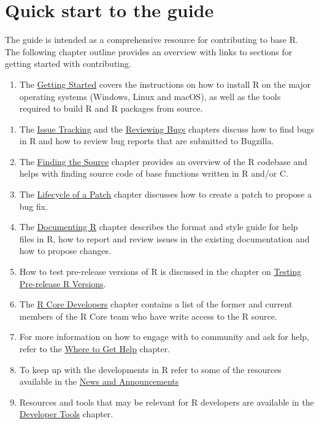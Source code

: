\documentclass[
  letterpaper,
  DIV=11,
  numbers=noendperiod]{scrreprt}
\providecommand{\tightlist}{%
  \setlength{\itemsep}{0pt}\setlength{\parskip}{0pt}}\usepackage{longtable,booktabs,array}
\begin{document}
\section{Quick start to the guide}\label{quick-start-to-the-guide}

The guide is intended as a comprehensive resource for contributing to
base R. The following chapter outline provides an overview with links to
sections for getting started with contributing.

\begin{enumerate}
\def\labelenumi{\arabic{enumi}.}
\tightlist
\item
  The \hyperref[GetStart]{Getting Started} covers the instructions on
  how to install R on the major operating systems (Windows, Linux and
  macOS), as well as the tools required to build R and R packages from
  source.
\end{enumerate}

\begin{enumerate}
\def\labelenumi{\arabic{enumi}.}
\setcounter{enumi}{1}
\item
  The \hyperref[IssueTrack]{Issue Tracking} and the
  \hyperref[ReviewBugs]{Reviewing Bugs} chapters discuss how to find
  bugs in R and how to review bug reports that are submitted to
  Bugzilla.
\item
  The \hyperref[FindSource]{Finding the Source} chapter provides an
  overview of the R codebase and helps with finding source code of base
  functions written in R and/or C.
\item
  The \hyperref[FixBug]{Lifecycle of a Patch} chapter discusses how to
  create a patch to propose a bug fix.
\item
  The \hyperref[Doc]{Documenting R} chapter describes the format and
  style guide for help files in R, how to report and review issues in
  the existing documentation and how to propose changes.
\item
  How to test pre-release versions of R is discussed in the chapter on
  \hyperref[TestRVer]{Testing Pre-release R Versions}.
\item
  The \hyperref[CoreDev]{R Core Developers} chapter contains a list of
  the former and current members of the R Core team who have write
  access to the R source.
\item
  For more information on how to engage with to community and ask for
  help, refer to the \hyperref[WhereToGetHelp]{Where to Get Help}
  chapter.
\item
  To keep up with the developments in R refer to some of the resources
  available in the \hyperref[News]{News and Announcements}
\item
  Resources and tools that may be relevant for R developers are
  available in the \hyperref[DevTools]{Developer Tools} chapter.
\end{enumerate}
\end{document}
